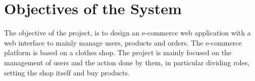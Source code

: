 \section{Objectives of the System}
The objective of the project, is to design an e-commerce web application with a web interface to mainly manage users,
products and orders. The e-commerce platform is based on a clothes shop. The project is mainly focused on the management 
of users and the action done by them, in particular dividing roles, setting the shop itself and buy products. 
